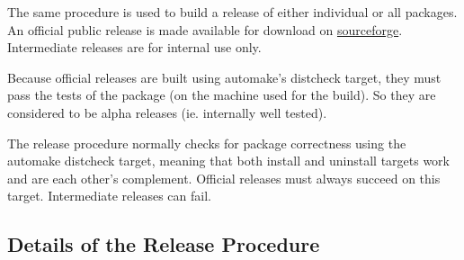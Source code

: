 \documentclass[12pt]{article}
\begin{document}
The same procedure is used to build a release of either individual or all packages. An official public release is made available for download on \href{http://sourceforge.net/projects/neurospaces/}{sourceforge}. Intermediate releases are for internal use only.

Because official releases are built using automake's distcheck target, they must pass the tests of the package (on the machine used for the build). So they are considered to be alpha releases (ie. internally well tested).

The release procedure normally checks for package correctness using the automake distcheck target, meaning that both install and uninstall targets work and are each other's complement. Official releases must always succeed on this target. Intermediate releases can fail.

\subsection*{Details of the Release Procedure}
\end{document}
